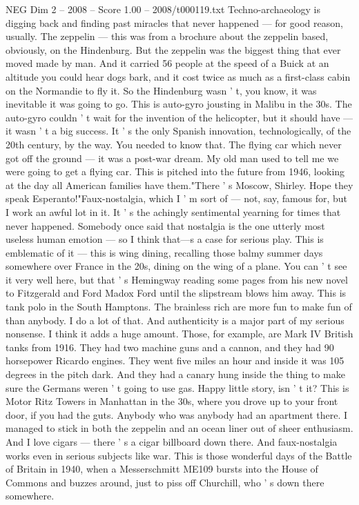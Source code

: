 \begin{textsample}{NEG Dim 2 – 2008 – Score 1.00 – 2008/t000119.txt}
Techno-archaeology is digging back and finding past miracles that never happened — for good reason, usually.
The zeppelin — this was from a brochure about the zeppelin based, obviously, on the Hindenburg.
But the zeppelin was the biggest thing that ever moved made by man.
And it carried 56 people at the speed of a Buick at an altitude you could hear dogs bark, and it cost twice as much as a first-class cabin on the Normandie to fly it.
So the Hindenburg wasn ' t, you know, it was inevitable it was going to go.
This is auto-gyro jousting in Malibu in the 30s.
The auto-gyro couldn ' t wait for the invention of the helicopter, but it should have — it wasn ' t a big success.
It ' s the only Spanish innovation, technologically, of the 20th century, by the way.
You needed to know that.
The flying car which never got off the ground — it was a post-war dream.
My old man used to tell me we were going to get a flying car.
This is pitched into the future from 1946, looking at the day all American families have them."There ' s Moscow, Shirley.
Hope they speak Esperanto!"Faux-nostalgia, which I ' m sort of — not, say, famous for, but I work an awful lot in it.
It ' s the achingly sentimental yearning for times that never happened.
Somebody once said that nostalgia is the one utterly most useless human emotion — so I think that—s a case for serious play.
This is emblematic of it — this is wing dining, recalling those balmy summer days somewhere over France in the 20s, dining on the wing of a plane.
You can ' t see it very well here, but that ' s Hemingway reading some pages from his new novel to Fitzgerald and Ford Madox Ford until the slipstream blows him away.
This is tank polo in the South Hamptons.
The brainless rich are more fun to make fun of than anybody.
I do a lot of that.
And authenticity is a major part of my serious nonsense.
I think it adds a huge amount.
Those, for example, are Mark IV British tanks from 1916.
They had two machine guns and a cannon, and they had 90 horsepower Ricardo engines.
They went five miles an hour and inside it was 105 degrees in the pitch dark.
And they had a canary hung inside the thing to make sure the Germans weren ' t going to use gas.
Happy little story, isn ' t it?
This is Motor Ritz Towers in Manhattan in the 30s, where you drove up to your front door, if you had the guts.
Anybody who was anybody had an apartment there.
I managed to stick in both the zeppelin and an ocean liner out of sheer enthusiasm.
And I love cigars — there ' s a cigar billboard down there.
And faux-nostalgia works even in serious subjects like war.
This is those wonderful days of the Battle of Britain in 1940, when a Messerschmitt ME109 bursts into the House of Commons and buzzes around, just to piss off Churchill, who ' s down there somewhere.

\end{textsample}
